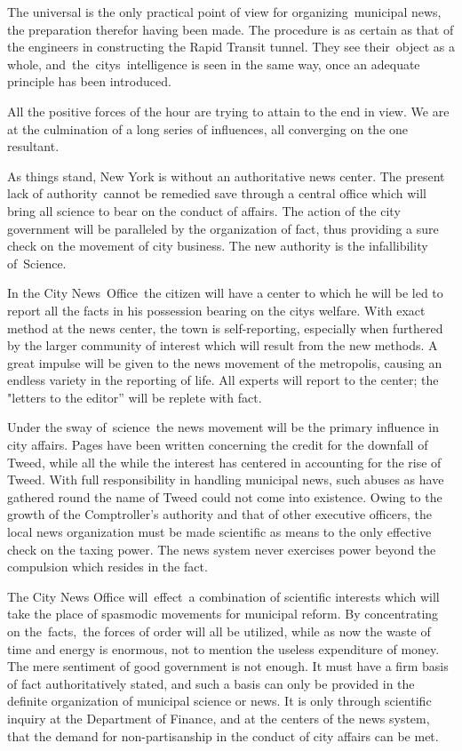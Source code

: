 \documentclass[twoside,symmetric,nobib,justified]{tufte-book}
\begin{document}
The universal is the only practical point of view for
organizing~municipal news, the preparation therefor having been made.
The procedure is as certain as that of the engineers in constructing the
Rapid Transit tunnel. They see their~object as a whole,
and~the~city\textquotesingle s~intelligence is seen in the same way,
once an adequate principle has been introduced.~~

All the positive forces of the hour are trying to attain to the end in
view. We are at the culmination of a long series of influences, all
converging on the one resultant.~~

As things stand, New York is without an authoritative news center. The
present lack of authority~cannot be remedied save through a central
office which will bring all science to bear on the conduct of affairs.
The action of the city government will be paralleled by the organization
of fact, thus providing a sure check on the movement of city business.
The new authority is the infallibility of~Science.~~

In the City News~Office~the citizen will have a center to which he will
be led to report all the facts in his possession bearing on the
city\textquotesingle s welfare. With exact method at the news center,
the town is self-reporting, especially when furthered by the larger
community of interest which will result from the new methods. A great
impulse will be given to the news movement of the metropolis, causing an
endless variety in the reporting of life. All experts will report to the
center; the "letters to the editor'' will be replete with fact.~

Under the sway of~science~the news movement will be the primary
influence in city affairs. Pages have been written concerning the credit
for the downfall of Tweed, while all the while the interest has centered
in accounting for the rise of Tweed. With full responsibility in
handling municipal news, such abuses as have gathered round the name of
Tweed could not come into existence. Owing to the growth of the
Comptroller's authority and that of other executive officers, the local
news organization must be made scientific as means to the only effective
check on the taxing power. The news system never exercises power beyond
the compulsion which resides in the fact.~~

The City News Office will~effect~a combination of scientific interests
which will take the place of spasmodic movements for municipal reform.
By concentrating on the~facts,~the forces of order will all be utilized,
while as now the waste of time and energy is enormous, not to mention
the useless expenditure of money. The mere sentiment of good government
is not enough. It must have a firm basis of fact authoritatively stated,
and such a basis can only be provided in the definite organization of
municipal science or news. It is only through scientific inquiry at the
Department of Finance, and at the centers of the news system, that the
demand for non-partisanship in the conduct of city affairs can be met.~
\end{document}
